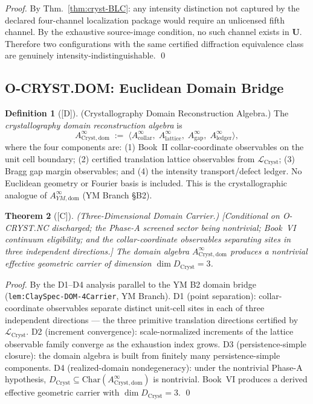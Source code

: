 \documentclass[12pt,oneside]{amsbook}
\theoremstyle{plain}
\newtheorem{theorem}{Theorem}[section]
\theoremstyle{definition}
\newtheorem{definition}[theorem]{Definition}
\theoremstyle{remark}
\newcommand{\status}[1]{\textup{[#1]}}
\begin{document}
\begin{proof}
By Thm.~\ref{thm:cryst-BLC}: any intensity distinction not
captured by the declared four-channel localization package would
require an unlicensed fifth channel.  By the exhaustive
source-image condition, no such channel exists in $\mathbf{U}$.
Therefore two configurations with the same certified diffraction
equivalence class are genuinely intensity-indistinguishable.
\qed
\end{proof}

\subsection{O-CRYST.DOM: Euclidean Domain Bridge}
\label{sec:cryst-DOM-discharge}

\begin{definition}[\status{D}]\label{def:cryst-domain-algebra}
\textup{(Crystallography Domain Reconstruction Algebra.)}
The \emph{crystallography domain reconstruction algebra} is
\[
  A^{\infty}_{\mathrm{Cryst,dom}} \;:=\;
  \langle A^{\infty}_{\mathrm{collar}},\;
    A^{\infty}_{\mathrm{lattice}},\;
    A^{\infty}_{\mathrm{gap}},\;
    A^{\infty}_{\mathrm{ledger}} \rangle,
\]
where the four components are: (1) Book~II collar-coordinate
observables on the unit cell boundary; (2) certified translation
lattice observables from $\mathcal{L}_{\mathrm{Cryst}}$; (3)
Bragg gap margin observables; and (4) the intensity transport/defect
ledger.  No Euclidean geometry or Fourier basis is included.
This is the crystallographic analogue of $A^{\infty}_{YM,\mathrm{dom}}$
(YM Branch §B2).
\end{definition}

\begin{theorem}[\status{C}]\label{thm:cryst-DOM-4carrier}
\textup{(Three-Dimensional Domain Carrier.)}
\textup{[Conditional on O-CRYST.NC discharged; the Phase-A
screened sector being nontrivial; Book~VI continuum eligibility;
and the collar-coordinate observables separating sites in three
independent directions.]}
The domain algebra $A^{\infty}_{\mathrm{Cryst,dom}}$ produces a
nontrivial effective geometric carrier of dimension
$\dim D_{\mathrm{Cryst}} = 3$.
\end{theorem}

\begin{proof}
By the D1--D4 analysis parallel to the YM B2 domain bridge
(\texttt{lem:ClaySpec-DOM-4Carrier}, YM Branch).
D1 (point separation): collar-coordinate observables separate
distinct unit-cell sites in each of three independent directions
--- the three primitive translation directions certified by
$\mathcal{L}_{\mathrm{Cryst}}$.
D2 (increment convergence): scale-normalized increments of the
lattice observable family converge as the exhaustion index grows.
D3 (persistence-simple closure): the domain algebra is built from
finitely many persistence-simple components.
D4 (realized-domain nondegeneracy): under the nontrivial Phase-A
hypothesis, $D_{\mathrm{Cryst}} \subseteq
\mathrm{Char}(A^{\infty}_{\mathrm{Cryst,dom}})$ is nontrivial.
Book~VI produces a derived effective geometric carrier with
$\dim D_{\mathrm{Cryst}} = 3$.
\qed
\end{proof}
\end{document}
